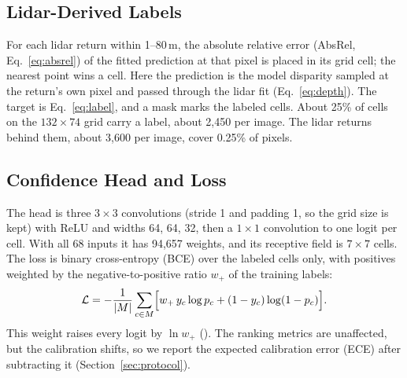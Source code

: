 \subsection{Lidar-Derived Labels}
\label{sec:labels}

For each lidar return within 1--80\,m, the absolute relative error (AbsRel, Eq.~\ref{eq:absrel}) of the fitted prediction at that pixel is placed in its grid cell; the nearest point wins a cell. Here the prediction is the model disparity sampled at the return's own pixel and passed through the lidar fit (Eq.~\ref{eq:depth}). The target is Eq.~\ref{eq:label}, and a mask marks the labeled cells. About 25\% of cells on the $132 \times 74$ grid carry a label, about 2,450 per image. The lidar returns behind them, about 3,600 per image, cover 0.25\% of pixels. 

\subsection{Confidence Head and Loss}
\label{sec:head}

The head is three $3 \times 3$ convolutions (stride 1 and padding 1, so the grid size is kept) with ReLU and widths 64, 64, 32, then a $1 \times 1$ convolution to one logit per cell. With all 68 inputs it has 94,657 weights, and its receptive field is $7 \times 7$ cells. The loss is binary cross-entropy (BCE) over the labeled cells only, with positives weighted by the negative-to-positive ratio $w_+$ of the training labels:
\begin{equation}
  \mathcal{L} = -\frac{1}{|M|} \sum_{c \in M} \Bigl[ w_+\, y_c \log p_c + (1 - y_c) \log (1 - p_c) \Bigr].
  \label{eq:loss}
\end{equation}
This weight raises every logit by $\ln w_+$ (). The ranking metrics are unaffected, but the calibration shifts, so we report the expected calibration error (ECE) after subtracting it (Section~\ref{sec:protocol}).

